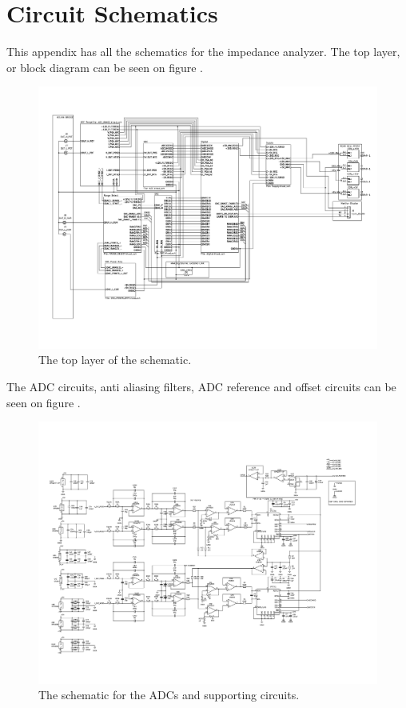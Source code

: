 \chapter{Circuit Schematics} \label{App:CircuitDiagrams}

This appendix has all the schematics for the impedance analyzer. The top layer, or block diagram can be seen on figure .

\begin{figure}[H]
    \centering
    \includegraphics[clip, trim=0 50 0 0, width=1\textwidth]{Appendix/Figures/A_SCHEMATIC_TOPBLOCKS.pdf}
    \caption{The top layer of the schematic.}
    \label{fig_A_SCH_TOP}
\end{figure}

The ADC circuits, anti aliasing filters, ADC reference and offset circuits can be seen on figure .

\begin{figure}[H]
    \centering
    \includegraphics[clip, trim=0 50 0 0, width=1\textwidth]{Appendix/Figures/A_SCH_ADC.pdf}
    \caption{The schematic for the ADCs and supporting circuits.}
    \label{fig_A_SCH_ADC}
\end{figure}

